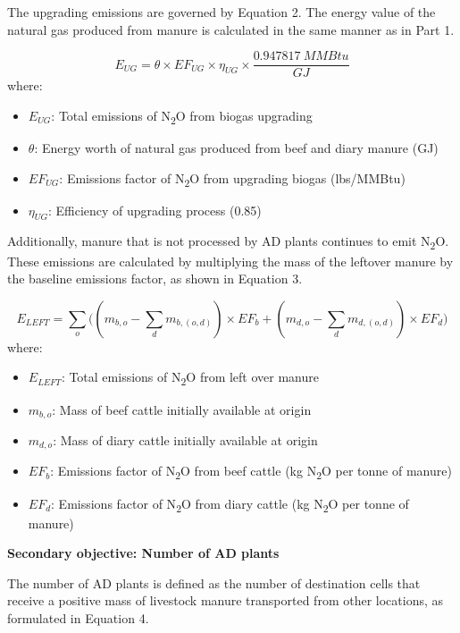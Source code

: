 \documentclass[12pt]{article}
\begin{document}
The upgrading emissions are governed by Equation 2. The energy value of the natural gas produced from manure is calculated in the same manner as in Part 1.

\begin{equation}
  E_{UG} = \theta \times EF_{UG} \times \eta_{UG} \times \frac{0.947817 \ MMBtu}{GJ}
\end{equation}
where:
\begin{itemize}
  \item $E_{UG}$: Total emissions of N\textsubscript{2}O from biogas upgrading
  \item $\theta$: Energy worth of natural gas produced from beef and diary manure (GJ)
  \item $EF_{UG}$: Emissions factor of N\textsubscript{2}O from upgrading biogas (lbs/MMBtu)
  \item $\eta_{UG}$: Efficiency of upgrading process (0.85)
\end{itemize}

Additionally, manure that is not processed by AD plants continues to emit N\textsubscript{2}O. These emissions are calculated by multiplying the mass of the leftover manure by the baseline emissions factor, as shown in Equation 3.

\begin{equation}
  E_{LEFT} = \sum_o\biggl((m_{b,o} - \sum_d m_{b, (o, d)}) \times EF_{b} + (m_{d,o} - \sum_d m_{d, (o, d)}) \times EF_d \biggr)
\end{equation}
where:
\begin{itemize}
  \item $E_{LEFT}$: Total emissions of N\textsubscript{2}O from left over manure
  \item $m_{b,o}$: Mass of beef cattle initially available at origin
  \item $m_{d,o}$: Mass of diary cattle initially available at origin
  \item $EF_b$: Emissions factor of N\textsubscript{2}O from beef cattle (kg N\textsubscript{2}O per tonne of manure)
  \item $EF_d$: Emissions factor of N\textsubscript{2}O from diary cattle (kg N\textsubscript{2}O per tonne of manure)
\end{itemize}

\vspace{10pt}
\textbf{Secondary objective: Number of AD plants}

The number of AD plants is defined as the number of destination cells that receive a positive mass of livestock manure transported from other locations, as formulated in Equation 4.
\end{document}
